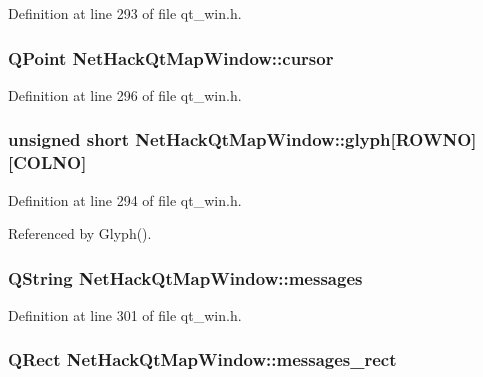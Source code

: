 Definition at line 293 of file qt\+\_\+win.\+h.

\hypertarget{classNetHackQtMapWindow_a6451ba4e2f665364617753d1bc57d5d5}{
\subsubsection[{cursor}]{\setlength{\rightskip}{0pt plus 5cm}Q\+Point Net\+Hack\+Qt\+Map\+Window\+::cursor\hspace{0.3cm}{\ttfamily [private]}}}\label{classNetHackQtMapWindow_a6451ba4e2f665364617753d1bc57d5d5}


Definition at line 296 of file qt\+\_\+win.\+h.

\hypertarget{classNetHackQtMapWindow_ae1ffb32e364b3b4a4f7e942177740fbe}{
\subsubsection[{glyph}]{\setlength{\rightskip}{0pt plus 5cm}unsigned short Net\+Hack\+Qt\+Map\+Window\+::glyph\mbox{[}{\bf R\+O\+W\+N\+O}\mbox{]}\mbox{[}{\bf C\+O\+L\+N\+O}\mbox{]}\hspace{0.3cm}{\ttfamily [private]}}}\label{classNetHackQtMapWindow_ae1ffb32e364b3b4a4f7e942177740fbe}


Definition at line 294 of file qt\+\_\+win.\+h.



Referenced by Glyph().

\hypertarget{classNetHackQtMapWindow_a750f7a7e26f94f0050b1a1fa562fbebd}{
\subsubsection[{messages}]{\setlength{\rightskip}{0pt plus 5cm}Q\+String Net\+Hack\+Qt\+Map\+Window\+::messages\hspace{0.3cm}{\ttfamily [private]}}}\label{classNetHackQtMapWindow_a750f7a7e26f94f0050b1a1fa562fbebd}


Definition at line 301 of file qt\+\_\+win.\+h.

\hypertarget{classNetHackQtMapWindow_aa8417d2ba975a48ae239a280223adbfd}{
\subsubsection[{messages\+\_\+rect}]{\setlength{\rightskip}{0pt plus 5cm}Q\+Rect Net\+Hack\+Qt\+Map\+Window\+::messages\+\_\+rect\hspace{0.3cm}{\ttfamily [private]}}}\label{classNetHackQtMapWindow_aa8417d2ba975a48ae239a280223adbfd}


